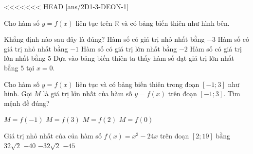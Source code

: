 <<<<<<< HEAD
\boxde
\BTTN
{}[ans/2D1-3-DEON-1]
\begin{ex}%
    Cho hàm số $y=f(x)$ liên tục trên $\mathbb{R}$ và có bảng biến thiên như hình bên.
    \begin{center}
    \end{center}
    Khẳng định nào sau đây là đúng?
    \choice
    {Hàm số có giá trị nhỏ nhất bằng $-3$}
    {Hàm số có giá trị nhỏ nhất bằng $-1$}
    {Hàm số có giá trị lớn nhất bằng $-2$}
    {\True Hàm số có giá trị lớn nhất bằng $5$}
    \loigiai
    {
        Dựa vào bảng biến thiên ta thấy hàm số đạt giá trị lớn nhất bằng $5$ tại $x=0$.
    }
\end{ex}
\begin{ex}%
    Cho hàm số $y=f(x)$ liên tục và có bảng biến thiên trong đoạn $[-1;3]$ như hình. Gọi $M$ là giá trị lớn nhất của hàm số $y=f(x)$ trên đoạn $\left[-1;3\right]$. Tìm mệnh đề đúng?
    \begin{center}
    \end{center}
    \choice
    {$M=f(-1)$}
    {$M=f(3)$}
    {$M=f(2)$}
    {\True $M=f(0)$}
\end{ex}
\begin{ex}%
    Giá trị nhỏ nhất của của hàm số $f(x)=x^3-24x$ trên đoạn $[2;19]$ bằng
    \choice
    {$32\sqrt{2}$}
    {$-40$}
    {\True $-32\sqrt{2}$}
    {$-45$}
\end{ex}
